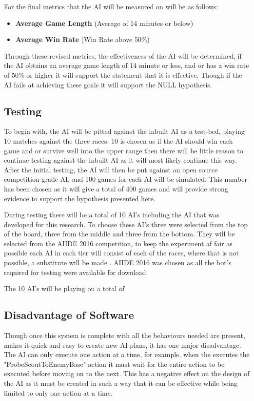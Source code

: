 \documentclass[journal]{IEEEtran}
\begin{document}
For the final metrics that the AI will be measured on will be as follows:
\begin{itemize}
	\item \textbf{Average Game Length} (Average of 14 minutes or below)
	\item \textbf{Average Win Rate} (Win Rate above 50\%)
\end{itemize}

Through these revised metrics, the effectiveness of the AI will be determined, if the AI obtains an average game length of 14 minute or less, and or has a win rate of 50\% or higher it will support the statement that it is effective. Though if the AI fails at achieving these goals it will support the NULL hypothesis.

\subsection{Testing}

To begin with, the AI will be pitted against the inbuilt AI as a test-bed, playing 10 matches against the three races. 10 is chosen as if the AI should win each game and or survive well into the upper range then there will be little reason to continue testing against the inbuilt AI as it will most likely continue this way. After the initial testing, the AI will then be put against an open source competition grade AI, and 100 games for each AI will be simulated. This number has been chosen as it will give a total of 400 games and will provide strong evidence to support the hypothesis presented here.

During testing there will be a total of 10 AI's including the AI that was developed for this research. To choose these AI's three were selected from the top of the board, three from the middle and three from the bottom. They will be selected from the AIIDE 2016 competition, to keep the experiment af fair as possible each AI in each tier will consist of each of the races, where that is not possible, a substitute will be made \cite{2016}. AIIDE 2016 was chosen as all the bot's required for testing were available for download.

The 10 AI's will be playing on a total of 


\subsection{Disadvantage of Software}
Though once this system is complete with all the behaviours needed are present, makes it quick and easy to create new AI plans, it has one major disadvantage. The AI can only execute one action at a time, for example, when the executes the "ProbeScoutToEnemyBase" action it must wait for the entire action to be executed before moving on to the next. This has a negative effect on the design of the AI as it must be created in such a way that it can be effective while being limited to only one action at a time.
\end{document}

